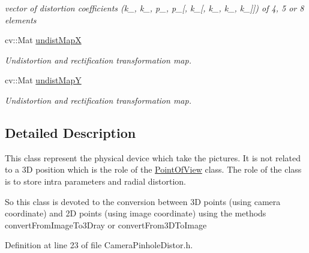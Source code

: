 \begin{DoxyCompactItemize}
\begin{DoxyCompactList}\small\item\em vector of distortion coefficients (k\_, k\_, p\_, p\_\mbox{[}, k\_\mbox{[}, k\_, k\_, k\_\mbox{]}\mbox{]}) of 4, 5 or 8 elements \end{DoxyCompactList}\item 
\hypertarget{class_opencv_sf_m_1_1_camera_pinhole_distor_acd36b9080acefe62757f4181d0bf4d70}{
cv::Mat \hyperlink{class_opencv_sf_m_1_1_camera_pinhole_distor_acd36b9080acefe62757f4181d0bf4d70}{undistMapX}}
\label{class_opencv_sf_m_1_1_camera_pinhole_distor_acd36b9080acefe62757f4181d0bf4d70}

\begin{DoxyCompactList}\small\item\em Undistortion and rectification transformation map. \end{DoxyCompactList}\item 
\hypertarget{class_opencv_sf_m_1_1_camera_pinhole_distor_ad222bd2f13252a82410216bbfc79a158}{
cv::Mat \hyperlink{class_opencv_sf_m_1_1_camera_pinhole_distor_ad222bd2f13252a82410216bbfc79a158}{undistMapY}}
\label{class_opencv_sf_m_1_1_camera_pinhole_distor_ad222bd2f13252a82410216bbfc79a158}

\begin{DoxyCompactList}\small\item\em Undistortion and rectification transformation map. \end{DoxyCompactList}\end{DoxyCompactItemize}


\subsection{Detailed Description}
This class represent the physical device which take the pictures. It is not related to a 3D position which is the role of the \hyperlink{class_opencv_sf_m_1_1_point_of_view}{PointOfView} class. The role of the class is to store intra parameters and radial distortion. 

So this class is devoted to the conversion between 3D points (using camera coordinate) and 2D points (using image coordinate) using the methods convertFromImageTo3Dray or convertFrom3DToImage 

Definition at line 23 of file CameraPinholeDistor.h.



